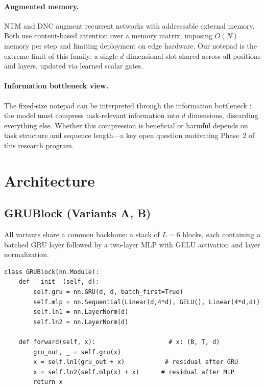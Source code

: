 \documentclass[11pt,a4paper]{article}
\begin{document}
\paragraph{Augmented memory.}
NTM \cite{graves2014neural} and DNC \cite{graves2016hybrid} augment
recurrent networks with addressable external memory.  Both use
content-based attention over a memory matrix, imposing $O(N)$ memory per
step and limiting deployment on edge hardware.  Our notepad is the extreme
limit of this family: a single $d$-dimensional slot shared across all
positions and layers, updated via learned scalar gates.

\paragraph{Information bottleneck view.}
The fixed-size notepad can be interpreted through the information bottleneck
\cite{tishby2000information}: the model must compress task-relevant
information into $d$ dimensions, discarding everything else.  Whether this
compression is beneficial or harmful depends on task structure and sequence
length---a key open question motivating Phase~2 of this research program.

\section{Architecture}
\label{sec:arch}

\subsection{GRUBlock (Variants A, B)}

All variants share a common backbone: a stack of $L{=}6$ blocks, each
containing a batched GRU layer followed by a two-layer MLP with GELU
activation and layer normalization.

\begin{lstlisting}[caption={GRUBlock forward pass.}]
class GRUBlock(nn.Module):
    def __init__(self, d):
        self.gru = nn.GRU(d, d, batch_first=True)
        self.mlp = nn.Sequential(Linear(d,4*d), GELU(), Linear(4*d,d))
        self.ln1 = nn.LayerNorm(d)
        self.ln2 = nn.LayerNorm(d)

    def forward(self, x):                    # x: (B, T, d)
        gru_out, _ = self.gru(x)
        x = self.ln1(gru_out + x)           # residual after GRU
        x = self.ln2(self.mlp(x) + x)      # residual after MLP
        return x
\end{lstlisting}
\end{document}
